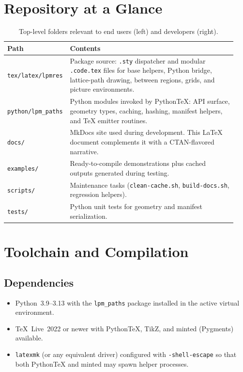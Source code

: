 \documentclass[11pt]{article}
\begin{document}
\section{Repository at a Glance}
\begin{table}[H]
  \centering
  \begin{tabular}{@{}p{0.22\linewidth}p{0.72\linewidth}@{}}
    \toprule
    Path & Contents \\
    \midrule
    \texttt{tex/latex/lpmres} & Package source: \texttt{.sty} dispatcher and modular \texttt{.code.tex} files for base helpers, Python bridge, lattice-path drawing, between regions, grids, and picture environments. \\
    \texttt{python/lpm\_paths} & Python modules invoked by PythonTeX: API surface, geometry types, caching, hashing, manifest helpers, and TeX emitter routines. \\
    \texttt{docs/} & MkDocs site used during development. This \LaTeX{} document complements it with a CTAN-flavored narrative. \\
    \texttt{examples/} & Ready-to-compile demonstrations plus cached outputs generated during testing. \\
    \texttt{scripts/} & Maintenance tasks (\texttt{clean-cache.sh}, \texttt{build-docs.sh}, regression helpers). \\
    \texttt{tests/} & Python unit tests for geometry and manifest serialization. \\
    \bottomrule
  \end{tabular}
  \caption{Top-level folders relevant to end users (left) and developers (right).}
\end{table}

\section{Toolchain and Compilation}
\subsection{Dependencies}
\begin{itemize}[leftmargin=2em]
  \item Python~3.9--3.13 with the \texttt{lpm\_paths} package installed in the active virtual environment.
  \item \TeX{}~Live~2022 or newer with PythonTeX, TikZ, and \textsf{minted} (Pygments) available.
  \item \texttt{latexmk} (or any equivalent driver) configured with \texttt{-shell-escape} so that both PythonTeX and \textsf{minted} may spawn helper processes.
\end{itemize}
\end{document}
